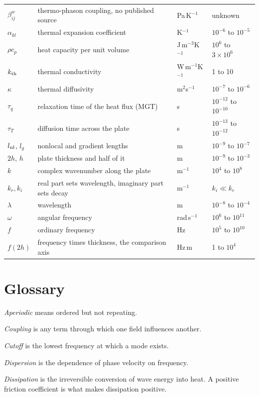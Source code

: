 \documentclass[11pt]{article}
\begin{document}
\begin{center}
\begin{tabular}{p{1.9cm}p{6.0cm}p{2.4cm}p{2.6cm}}
$\beta^{w}_{ij}$ & thermo-phason coupling, no published source & Pa\,K$^{-1}$ & unknown\\
$\alpha_{kl}$ & thermal expansion coefficient & K$^{-1}$ & $10^{-6}$ to $10^{-5}$\\
$\rho c_p$ & heat capacity per unit volume & J\,m$^{-3}$K$^{-1}$ & $10^{6}$ to $3\times10^{6}$\\
$k_{\rm th}$ & thermal conductivity & W\,m$^{-1}$K$^{-1}$ & 1 to 10\\
$\kappa$ & thermal diffusivity & m$^2$s$^{-1}$ & $10^{-7}$ to $10^{-6}$\\
$\tau_q$ & relaxation time of the heat flux (MGT) & s & $10^{-12}$ to $10^{-10}$\\
$\tau_T$ & diffusion time across the plate & s & $10^{-13}$ to $10^{-12}$\\
$l_{\rm nl}$, $l_g$ & nonlocal and gradient lengths & m & $10^{-9}$ to $10^{-7}$\\
$2h$, $h$ & plate thickness and half of it & m & $10^{-9}$ to $10^{-3}$\\
$k$ & complex wavenumber along the plate & m$^{-1}$ & $10^{4}$ to $10^{8}$\\
$k_r,k_i$ & real part sets wavelength, imaginary part sets decay & m$^{-1}$ & $k_i\ll k_r$\\
$\lambda$ & wavelength & m & $10^{-8}$ to $10^{-4}$\\
$\omega$ & angular frequency & rad\,s$^{-1}$ & $10^{6}$ to $10^{11}$\\
$f$ & ordinary frequency & Hz & $10^{5}$ to $10^{10}$\\
$f(2h)$ & frequency times thickness, the comparison axis & Hz\,m & 1 to $10^{4}$\\
\bottomrule
\end{tabular}
\end{center}

\section{Glossary}

\textit{Aperiodic} means ordered but not repeating.

\textit{Coupling} is any term through which one field influences another.

\textit{Cutoff} is the lowest frequency at which a mode exists.

\textit{Dispersion} is the dependence of phase velocity on frequency.

\textit{Dissipation} is the irreversible conversion of wave energy into heat. A positive friction coefficient
is what makes dissipation positive.
\end{document}
